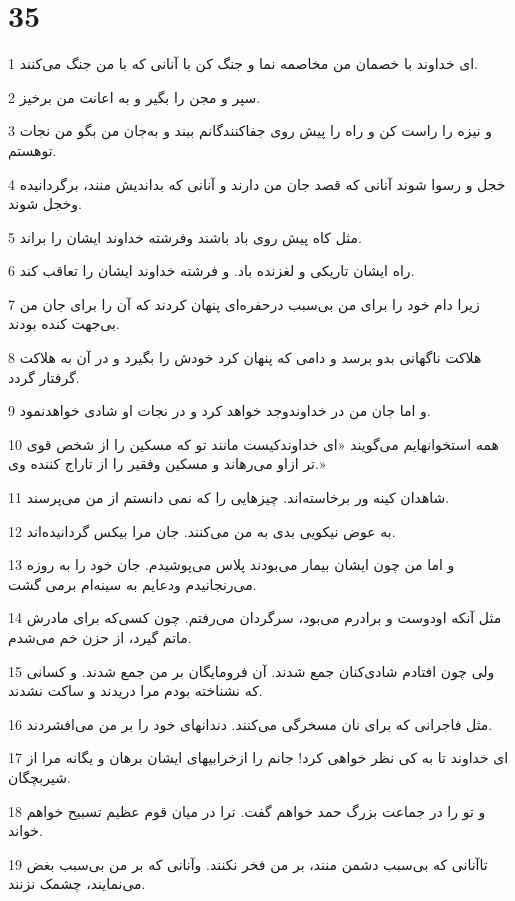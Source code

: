 \chapter{35}

\par 1 ای خداوند با خصمان من مخاصمه نما و جنگ کن با آنانی که با من جنگ می‌کنند.
\par 2 سپر و مجن را بگیر و به اعانت من برخیز.
\par 3 و نیزه را راست کن و راه را پیش روی جفاکنندگانم ببند و به‌جان من بگو من نجات توهستم.
\par 4 خجل و رسوا شوند آنانی که قصد جان من دارند و آنانی که بداندیش منند، برگردانیده وخجل شوند.
\par 5 مثل کاه پیش روی باد باشند وفرشته خداوند ایشان را براند.
\par 6 راه ایشان تاریکی و لغزنده باد. و فرشته خداوند ایشان را تعاقب کند.
\par 7 زیرا دام خود را برای من بی‌سبب درحفره‌ای پنهان کردند که آن را برای جان من بی‌جهت کنده بودند.
\par 8 هلاکت ناگهانی بدو برسد و دامی که پنهان کرد خودش را بگیرد و در آن به هلاکت گرفتار گردد.
\par 9 و اما جان من در خداوندوجد خواهد کرد و در نجات او شادی خواهدنمود.
\par 10 همه استخوانهایم می‌گویند «ای خداوندکیست مانند تو که مسکین را از شخص قوی تر ازاو می‌رهاند و مسکین وفقیر را از تاراج کننده وی.»
\par 11 شاهدان کینه ور برخاسته‌اند. چیزهایی را که نمی دانستم از من می‌پرسند.
\par 12 به عوض نیکویی بدی به من می‌کنند. جان مرا بیکس گردانیده‌اند.
\par 13 و اما من چون ایشان بیمار می‌بودند پلاس می‌پوشیدم. جان خود را به روزه می‌رنجانیدم ودعایم به سینه‌ام برمی گشت.
\par 14 مثل آنکه اودوست و برادرم می‌بود، سرگردان می‌رفتم. چون کسی‌که برای مادرش ماتم گیرد، از حزن خم می‌شدم.
\par 15 ولی چون افتادم شادی‌کنان جمع شدند. آن فرومایگان بر من جمع شدند. و کسانی که نشناخته بودم مرا دریدند و ساکت نشدند.
\par 16 مثل فاجرانی که برای نان مسخرگی می‌کنند. دندانهای خود را بر من می‌افشردند.
\par 17 ‌ای خداوند تا به کی نظر خواهی کرد! جانم را ازخرابیهای ایشان برهان و یگانه مرا از شیربچگان.
\par 18 و تو را در جماعت بزرگ حمد خواهم گفت. ترا در میان قوم عظیم تسبیح خواهم خواند.
\par 19 تاآنانی که بی‌سبب دشمن منند، بر من فخر نکنند. وآنانی که بر من بی‌سبب بغض می‌نمایند، چشمک نزنند.
